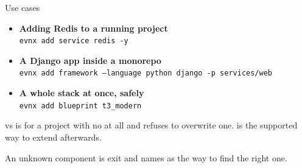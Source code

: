 \begin{frame}{Use cases}
  \begin{itemize}
    \item \textbf{Adding Redis to a running project}\\
      {\footnotesize\texttt{evnx add service redis -y}}
    \item \textbf{A Django app inside a monorepo}\\
      {\footnotesize\texttt{evnx add framework --language python django -p services/web}}
    \item \textbf{A whole stack at once, safely}\\
      {\footnotesize\texttt{evnx add blueprint t3\_modern}}
  \end{itemize}

  \vspace{0.8em}
  \begin{block}{ vs }
     is for a project with no  at all and refuses to
    overwrite one.  is the supported way to extend afterwards.
  \end{block}

  \vspace{0.4em}
  {\footnotesize An unknown component is exit \exittwo{} and names
   as the way to find the right one.}
\end{frame}
